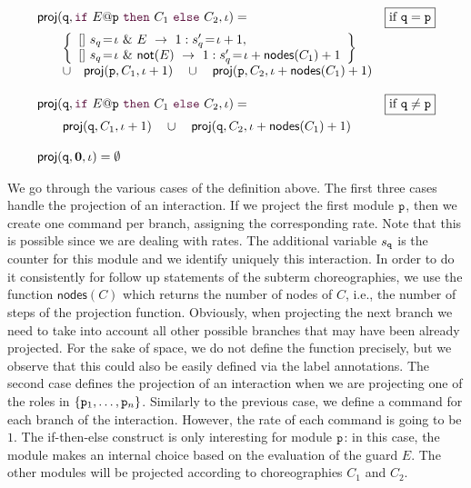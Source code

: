 \begin{definition}
\begin{displaymath}
\begin{array}{lr}
          \proj (\role q,\ifTE {E}{p}{C_1}{C_2}, \iota) = 
          &  \boxed{\text{if }\role q=\role p}\\[2mm]
          \qquad\left\{ 
          \begin{array}{lll}
            \commandBase {} {s_{q}\!=\! \iota\ \&\ E}{\ 1: s'_{q}\!=\! \iota+1},\\ 
            \commandBase {} {s_{q}\!=\! \iota\ \&\ \mathsf{not}(E)}
            {\ 1: s'_{q}\!=\! \iota+\mathsf{nodes}(C_1)+1}
          \end{array}
          \right\}
          \\
          \qquad\cup\quad \proj (\role{p}, C_1, \iota+1)
          \quad\cup\quad
          \proj (\role{p}, C_2, \iota+\mathsf{nodes}(C_1)+1)
          \\\\

          \proj (\role q,\ifTE {E}{p}{C_1}{C_2}, \iota) = 
          &  \boxed{\text{if }\role q\neq\role p}\\[2mm]
          \qquad\proj (\role{q}, C_1, \iota+1)
          \quad\cup\quad
          \proj (\role{q}, C_2, \iota+\mathsf{nodes}(C_1)+1)

          \\\\

          \proj (\role q,\CEnd, \iota) = \emptyset

        \end{array}
      \end{displaymath}
    \end{definition}
    We go through the various cases of the definition above. The first
    three cases handle the projection of an interaction. If we project
    the first module $\mathtt{p}$, then we create one command per branch,
    assigning the corresponding rate. Note that this is possible since
    we are dealing with rates. The additional variable $s_{\mathtt{q}}$
    is the counter for this module and we identify uniquely this
    interaction. In order to do it consistently for follow up
    statements of the subterm choreographies, we use the function
    $\mathsf{nodes}(C)$ which returns the number of nodes of $C$,
    i.e., the number of steps of the projection function. Obviously,
    when projecting the next branch we need to take into account all
    other possible branches that may have been already projected. For
    the sake of space, we do not define the function precisely, but we
    observe that this could also be easily defined via the label
    annotations. The second case defines the projection of an
    interaction when we are projecting one of the roles in
    $\{\mathtt{p}_1,\ldots,\mathtt{p}_n\}$. Similarly to the previous case,
    we define a command for each branch of the interaction. However,
    the rate of each command is going to be $1$. The if-then-else
    construct is only interesting for module $\mathtt{p}$: in this case,
    the module makes an internal choice based on the evaluation of the
    guard $E$. The other modules will be projected according to
    choreographies $C_1$ and $C_2$.

